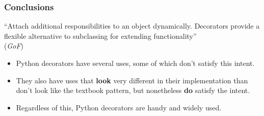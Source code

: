 \documentclass[10pt]{beamer}
\begin{document}
\begin{frame}
  \frametitle{Conclusions}
  
  ``Attach additional responsibilities to an object dynamically. Decorators
  provide a flexible alternative to subclassing for extending functionality'' \\
  (\emph{GoF})

  \begin{itemize}
    \item Python decorators have several uses, some of which don't satisfy this intent.
    \item They also have uses that \textbf{look} very different in their implementation than don't
    look like the textbook pattern, but nonetheless \textbf{do} satisfy the intent.
    \item Regardless of this, Python decorators are handy and widely used.
  \end{itemize}
\end{frame}
\end{document}
